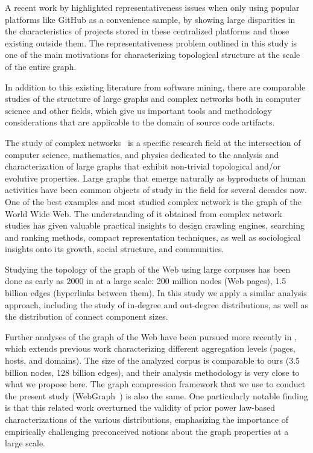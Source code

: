 A recent work by \textcite{trujillo2021penumbra} highlighted
representativeness issues when only using popular platforms like GitHub as a
convenience sample, by showing large disparities in the characteristics of
projects stored in these centralized platforms and those existing outside them.
The representativeness problem outlined in this study is one of the main
motivations for characterizing topological structure at the scale of the entire
graph.

In addition to this existing literature from software mining, there are
comparable studies of the structure of large graphs and complex networks both
in computer science and other fields, which give us important tools and
methodology considerations that are applicable to the domain of source code
artifacts.

The study of complex networks~\cite{barabasi2002networkstats,
  barabasi2003scalefree} is a specific research field at the intersection of
computer science, mathematics, and physics dedicated to the analysis and
characterization of large graphs that exhibit non-trivial topological and/or
evolutive properties. Large graphs that emerge naturally as byproducts of human
activities have been common objects of study in the field for several decades
now.
One of the best examples and most studied complex network is the graph of the
World Wide Web. The understanding of it obtained from complex network studies
has given valuable practical insights to design crawling engines, searching and
ranking methods, compact representation techniques, as well as sociological
insights onto its growth, social structure, and communities.

Studying the topology of the graph of the Web using large corpuses has been
done as early as 2000 in \textcite{broder2000graph} at a large scale: 200
million nodes (Web pages), 1.5 billion edges (hyperlinks between them). In this
study we apply a similar analysis approach, including the study of in-degree
and out-degree distributions, as well as the distribution of connect component
sizes.

Further analyses of the graph of the Web have been pursued more recently
in \textcite{vigna2015webstruct}, which extends previous work characterizing
different aggregation levels (pages, hosts, and domains). The size of the
analyzed corpus is comparable to ours (3.5 billion nodes, 128 billion edges),
and their analysis methodology is very close to what we propose here. The graph
compression framework that we use to conduct the present study
(WebGraph~\cite{boldi-vigna-webgraph-1, boldi-vigna-webgraph-2}) is also the
same. One particularly notable finding is that this related work overturned the
validity of prior power law-based characterizations of the various
distributions, emphasizing the importance of empirically challenging
preconceived notions about the graph properties at a large scale.

